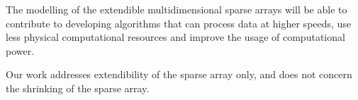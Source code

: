 The modelling of the extendible multidimensional sparse arrays will be able to contribute to developing algorithms that can process data at higher speeds, use less physical computational resources and improve the usage of computational power.

Our work addresses extendibility of the sparse array only, and does not concern the shrinking of the sparse array.

